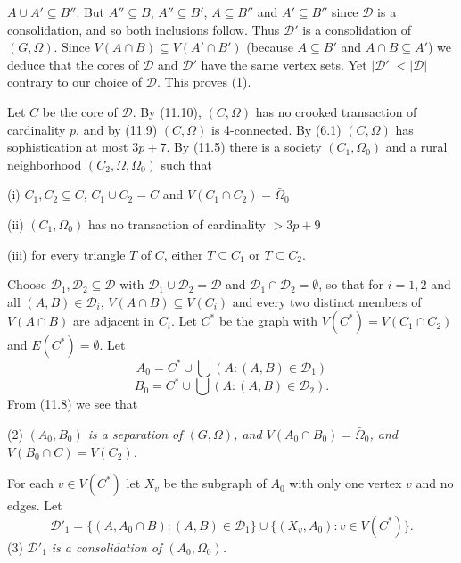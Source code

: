 \noindent $A \cup A' \subseteq B''$. But $A'' \subseteq B$, $A'' \subseteq B'$, $A \subseteq B''$ and $A' \subseteq B''$ since $\mathcal{D}$ is a consolidation, and so both inclusions follow. Thus $\mathcal{D}'$ is a consolidation of $(G, \Omega)$. Since $V(A \cap B) \subseteq V(A' \cap B')$ (because $A \subseteq B'$ and $A \cap B \subseteq A'$) we deduce that the cores of $\mathcal{D}$ and $\mathcal{D}'$ have the same vertex sets. Yet $|\mathcal{D}'| < |\mathcal{D}|$ contrary to our choice of $\mathcal{D}$. This proves (1).

Let $C$ be the core of $\mathcal{D}$. By (11.10), $(C, \Omega)$ has no crooked transaction of cardinality $p$, and by (11.9) $(C, \Omega)$ is 4-connected. By (6.1) $(C, \Omega)$ has sophistication at most $3p + 7$. By (11.5) there is a society $(C_1, \Omega_0)$ and a rural neighborhood $(C_2, \Omega, \Omega_0)$ such that

\hspace*{12pt}(i) $C_1, C_2 \subseteq C$, $C_1 \cup C_2 = C$ and $V(C_1 \cap C_2) = \bar{\Omega}_0$

\hspace*{12pt}(ii) $(C_1, \Omega_0)$ has no transaction of cardinality $> 3p + 9$

\hspace*{12pt}(iii) for every triangle $T$ of $C$, either $T \subseteq C_1$ or $T \subseteq C_2$.

Choose $\mathcal{D}_1, \mathcal{D}_2 \subseteq \mathcal{D}$ with $\mathcal{D}_1 \cup \mathcal{D}_2 = \mathcal{D}$ and $\mathcal{D}_1 \cap \mathcal{D}_2 = \emptyset$, so that for $i = 1, 2$ and all $(A, B) \in \mathcal{D}_i$, $V(A \cap B) \subseteq V(C_i)$ and every two distinct members of $V(A \cap B)$ are adjacent in $C_i$. Let $C^*$ be the graph with $V(C^*) = V(C_1 \cap C_2)$ and $E(C^*) = \emptyset$. Let
\begin{equation*}
A_0 = C^* \cup \bigcup (A: (A, B) \in \mathcal{D}_1)
\end{equation*}
\begin{equation*}
B_0 = C^* \cup \bigcup (A: (A, B) \in \mathcal{D}_2).
\end{equation*}
From (11.8) we see that

\hspace*{12pt}(2) \textit{$(A_0, B_0)$ is a separation of $(G, \Omega)$, and $V(A_0 \cap B_0) = \bar{\Omega}_0$, and $V(B_0 \cap C) = V(C_2)$.}

For each $v \in V(C^*)$ let $X_v$ be the subgraph of $A_0$ with only one vertex $v$ and no edges. Let
\begin{equation*}
\mathcal{D}'_1 = \{(A, A_0 \cap B): (A, B) \in \mathcal{D}_1\} \cup \{(X_v, A_0): v \in V(C^*)\}.
\end{equation*}
\hspace*{12pt}(3) \textit{$\mathcal{D}'_1$ is a consolidation of $(A_0, \Omega_0)$.}

